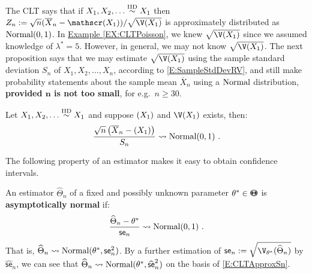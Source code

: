 The CLT says that if $X_1,X_2,\ldots \overset{{\rm IID}}{\sim} X_1$ then $Z_n := \sqrt{n}(\overline{X}_n-\E(X_1))/\sqrt{\V(X_1)}$ is approximately distributed as $\mbox{{\rm Normal}}(0,1)$.  In \hyperref[EX:CLTPoisson]{Example \ref*{EX:CLTPoisson}}, we knew $\sqrt{\V(X_1)}$ since we assumed knowledge of $\lambda^*=5$.   However, in general, we may not know $\sqrt{\V(X_1)}$.  The next proposition says that we may estimate $\sqrt{\V(X_1)}$ using the sample standard deviation $S_n$ of $X_1,X_2,\ldots,X_n$, according to \eqref{E:SampleStdDevRV}, and still make probability statements about the sample mean $\overline{X}_n$ using a $\mbox{{\rm Normal}}$ distribution, {\bf provided $\mathbf{n}$ is not too small}, for e.g.~$n \geq 30$.
\begin{prop}
Let $X_1,X_2,\ldots \overset{{\rm IID}}{\sim} X_1$ and suppose $\mathscr{(}X_1)$ and $\V(X_1)$ exists, then:
\begin{equation}\label{E:CLTApproxSn}
\frac{\sqrt{n} \left( \overline{X}_n - \mathscr{(}X_1) \right)}{S_n} \rightsquigarrow \mbox{{\rm Normal}}(0,1) \ .
\end{equation}
\end{prop}

The following property of an estimator makes it easy to obtain confidence intervals.
\begin{definition}
An estimator $\widehat{\Theta}_n$ of a fixed and possibly unknown parameter $\theta^* \in {\Theta}\mspace{-11 mu}{\Theta}$ is {\bf asymptotically normal} if:
\begin{equation}\label{E:AsymptoticNormalEstimator}
\frac{\widehat{\Theta}_n - \theta^*}{\mathsf{se}_n} \rightsquigarrow \mbox{{\rm Normal}}(0,1) \ .
\end{equation} 
That is, $\widehat{\Theta}_n \rightsquigarrow \mbox{{\rm Normal}}(\theta^*,\mathsf{se}_n^2)$.  By a further estimation of $\mathsf{se}_n := \sqrt{\V_{\theta^*}(\widehat{\Theta}_n)}$ by $\widehat{\mathsf{se}}_n$, we can see that $\widehat{\Theta}_n \rightsquigarrow \mbox{{\rm Normal}}(\theta^*,\widehat{\mathsf{se}}_n^2)$ on the basis of \eqref{E:CLTApproxSn}.
\end{definition}

